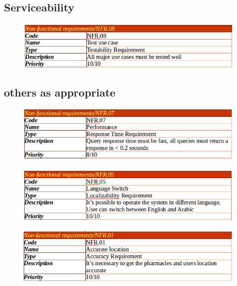\documentclass[]{article}
\begin{document}
\subsection {Serviceability}

\begin{figure}[H]
\centering
\includegraphics[scale=0.4]{./nonf/07}
\end{figure}

\subsection {others as appropriate}

\begin{figure}[H]
\centering
\includegraphics[scale=0.4]{./nonf/08}
\end{figure}

\begin{figure}[H]
\centering
\includegraphics[scale=0.4]{./nonf/09}
\end{figure}

\begin{figure}[H]
\centering
\includegraphics[scale=0.4]{./nonf/10}
\end{figure}
\end{document}
